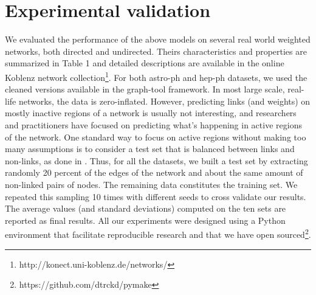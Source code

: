 \section{Experimental validation}
\label{sec:exps}

We evaluated the performance of the above models on several real world weighted networks, both directed and undirected. Theirs characteristics and properties are summarized in Table 1 and detailed descriptions are available in the online Koblenz network collection\footnote{http://konect.uni-koblenz.de/networks/}. For both astro-ph and hep-ph datasets, we used the cleaned versions available in the  graph-tool framework.
In most large scale, real-life networks, the data is zero-inflated. However, predicting links (and weights) on mostly inactive regions of a network is usually not interesting, and researchers and practitioners have focused on predicting what's happening in active regions of the network. One standard way to focus on active regions without making too many assumptions is to consider a test set that is balanced between links and non-links, as done in \cite{kim2013efficient}. 
 Thus, for all the datasets, we built a test set by extracting randomly 20 percent of the edges of the network and about the same amount of non-linked pairs of nodes.
 The remaining data constitutes the training set. We repeated this sampling 10 times with different seeds to cross validate our results. The average values (and standard deviations) computed on the ten sets are reported as final results. All our experiments were designed using a Python environment that facilitate reproducible research and that we have open sourced\footnote{https://github.com/dtrckd/pymake}.

